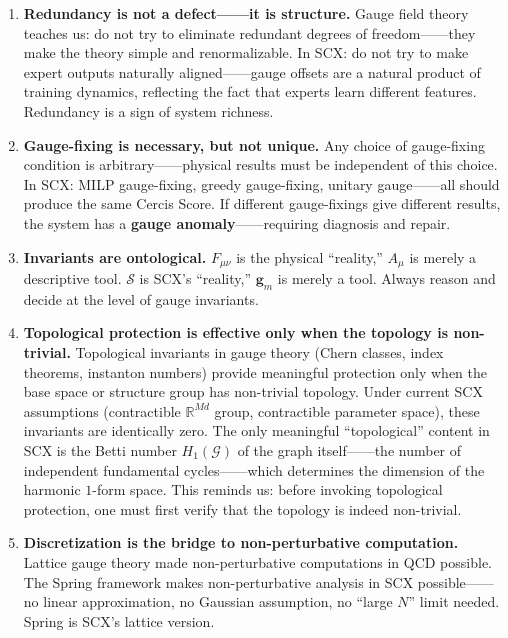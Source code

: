 \documentclass[12pt,a4paper]{article}
\newcommand{\grph}{\mathcal{G}}
\theoremstyle{remark}
\newcommand{\R}{\mathbb{R}}
\newcommand{\CercisScore}{\mathcal{S}}
\newcommand{\gaugeparam}{\mathbf{g}}
\begin{document}
\begin{enumerate}[label=\textbf{Meta-Lesson \arabic*:}]
    \item \textbf{Redundancy is not a defect——it is structure.}
    Gauge field theory teaches us: do not try to eliminate redundant degrees of freedom——they make the theory simple and renormalizable.
    In SCX: do not try to make expert outputs naturally aligned——gauge offsets are a natural product of training dynamics,
    reflecting the fact that experts learn different features. Redundancy is a sign of system richness.

    \item \textbf{Gauge-fixing is necessary, but not unique.}
    Any choice of gauge-fixing condition is arbitrary——physical results must be independent of this choice.
    In SCX: MILP gauge-fixing, greedy gauge-fixing, unitary gauge——all should produce the same Cercis Score.
    If different gauge-fixings give different results, the system has a \textbf{gauge anomaly}——requiring diagnosis and repair.

    \item \textbf{Invariants are ontological.}
    $F_{\mu\nu}$ is the physical ``reality,'' $A_\mu$ is merely a descriptive tool.
    $\CercisScore$ is SCX's ``reality,'' $\gaugeparam_m$ is merely a tool.
    Always reason and decide at the level of gauge invariants.

    \item \textbf{Topological protection is effective only when the topology is non-trivial.}
    Topological invariants in gauge theory (Chern classes, index theorems, instanton numbers) provide meaningful protection only when the base space or structure group
    has non-trivial topology. Under current SCX assumptions (contractible $\R^{Md}$ group,
    contractible parameter space), these invariants are identically zero. The only meaningful ``topological'' content in SCX is
    the Betti number $H_1(\grph)$ of the graph itself——the number of independent fundamental cycles——which determines the dimension of the harmonic $1$-form
    space. This reminds us: before invoking topological protection, one must first verify that the topology is indeed non-trivial.

    \item \textbf{Discretization is the bridge to non-perturbative computation.}
    Lattice gauge theory made non-perturbative computations in QCD possible. The Spring framework makes non-perturbative
    analysis in SCX possible——no linear approximation, no Gaussian assumption, no
    ``large $N$'' limit needed. Spring is SCX's lattice version.


\end{enumerate}
\end{document}
